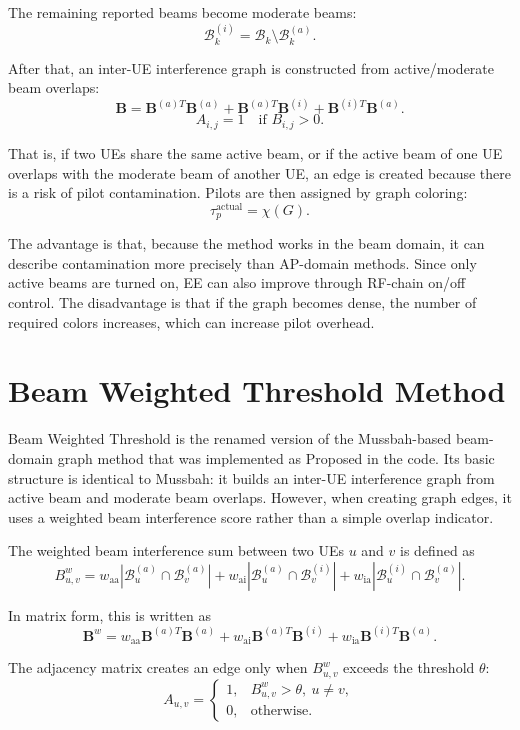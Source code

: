 \documentclass[11pt,a4paper]{article}
\newcommand{\tauactual}{\tau_{p}^{\mathrm{actual}}}
\newcommand{\waa}{w_{\mathrm{aa}}}
\newcommand{\wai}{w_{\mathrm{ai}}}
\newcommand{\wia}{w_{\mathrm{ia}}}
\begin{document}
The remaining reported beams become moderate beams:
\[
    \mathcal{B}_{k}^{(i)}
    =
    \mathcal{B}_{k}\setminus \mathcal{B}_{k}^{(a)}.
\]

After that, an inter-UE interference graph is constructed from active/moderate beam overlaps:
\[
    \mathbf{B}
    =
    \mathbf{B}^{(a)T}\mathbf{B}^{(a)}
    +
    \mathbf{B}^{(a)T}\mathbf{B}^{(i)}
    +
    \mathbf{B}^{(i)T}\mathbf{B}^{(a)}.
\]
\[
    A_{i,j}=1 \quad \text{if } B_{i,j}>0.
\]

That is, if two UEs share the same active beam, or if the active beam of one UE overlaps with the moderate beam of another UE, an edge is created because there is a risk of pilot contamination. Pilots are then assigned by graph coloring:
\[
    \tauactual=\chi(G).
\]

The advantage is that, because the method works in the beam domain, it can describe contamination more precisely than AP-domain methods. Since only active beams are turned on, EE can also improve through RF-chain on/off control. The disadvantage is that if the graph becomes dense, the number of required colors increases, which can increase pilot overhead.

\section{Beam Weighted Threshold Method}

Beam Weighted Threshold is the renamed version of the Mussbah-based beam-domain graph method that was implemented as Proposed in the code. Its basic structure is identical to Mussbah: it builds an inter-UE interference graph from active beam and moderate beam overlaps. However, when creating graph edges, it uses a weighted beam interference score rather than a simple overlap indicator.

The weighted beam interference sum between two UEs \(u\) and \(v\) is defined as
\[
    B_{u,v}^{w}
    =
    \waa\left|\mathcal{B}_{u}^{(a)}\cap\mathcal{B}_{v}^{(a)}\right|
    +
    \wai\left|\mathcal{B}_{u}^{(a)}\cap\mathcal{B}_{v}^{(i)}\right|
    +
    \wia\left|\mathcal{B}_{u}^{(i)}\cap\mathcal{B}_{v}^{(a)}\right|.
\]

In matrix form, this is written as
\[
    \mathbf{B}^{w}
    =
    \waa\mathbf{B}^{(a)T}\mathbf{B}^{(a)}
    +
    \wai\mathbf{B}^{(a)T}\mathbf{B}^{(i)}
    +
    \wia\mathbf{B}^{(i)T}\mathbf{B}^{(a)}.
\]

The adjacency matrix creates an edge only when \(B_{u,v}^{w}\) exceeds the threshold \(\theta\):
\[
    A_{u,v}
    =
    \begin{cases}
        1, & B_{u,v}^{w}>\theta,\ u\neq v,\\
        0, & \text{otherwise.}
    \end{cases}
\]
\end{document}
